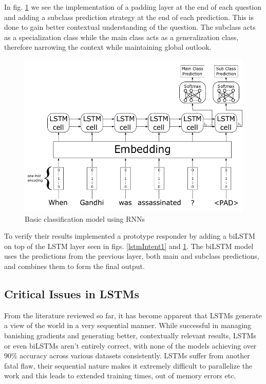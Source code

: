 \documentclass[a4paper,12pt]{report}
\begin{document}
		In fig. \ref{lstmIntent2} we see the implementation of a padding layer at the end of each question and adding a subclass prediction strategy at the end of each prediction. This is done to gain better contextual understanding of the question. The subclass acts as a specialization class while the main class acts as a generalization class, therefore narrowing the context while maintaining global outlook. 
		\begin{figure}[!h]
			\centering
			\includegraphics[scale=0.35]{../images/lstm-intent2.png}
			\caption{Basic classification model using RNNs \citep{lstmintent}}\label{lstmIntent2}
		\end{figure}
		To verify their results \citep{lstmintent} implemented a prototype responder by adding a biLSTM on top of the LSTM layer seen in figs. \ref{lstmIntent1} and \ref{lstmIntent2}.  The biLSTM model uses the predictions from the previous layer, both main and subclass predictions, and combines them to form the final output. 

		\subsection{Critical Issues in LSTMs}\label{c2criticalissues}
		
		From the literature reviewed so far, it has become apparent that LSTMs generate a view of the world in a very sequential manner. While successful in managing banishing gradients and generating better, contextually relevant results, LSTMs or even biLSTMs aren't entirely correct, with none of the models achieving over 90\% accuracy across various datasets consistently. LSTMs suffer from another fatal flaw, their sequential nature makes it extremely difficult to parallelize the work and this leads to extended training times, out of memory errors etc. 
		
\end{document}
